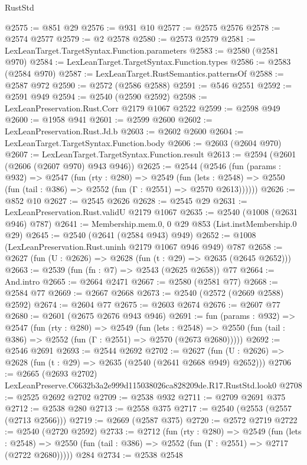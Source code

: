 \begin{lexlean}{RustStd}
\begin{coremodule}
@2575 := @851 @29
@2576 := @931 @10
@2577 := @2575 @2576
@2578 := @2574 @2577
@2579 := @2 @2578
@2580 := @2573 @2579
@2581 := LexLeanTarget.TargetSyntax.Function.parameters
@2583 := @2580 (@2581 @970)
@2584 := LexLeanTarget.TargetSyntax.Function.types
@2586 := @2583 (@2584 @970)
@2587 := LexLeanTarget.RustSemantics.patternsOf
@2588 := @2587 @972
@2590 := @2572 (@2586 @2588)
@2591 := @546 @2551
@2592 := @2591 @949
@2594 := @2540 (@2590 @2592)
@2598 := LexLeanPreservation.Rust.Corr @2179 @1067 @2522
@2599 := @2598 @949
@2600 := @1958 @941
@2601 := @2599 @2600
@2602 := LexLeanPreservation.Rust.Jd.b
@2603 := @2602 @2600
@2604 := LexLeanTarget.TargetSyntax.Function.body
@2606 := @2603 (@2604 @970)
@2607 := LexLeanTarget.TargetSyntax.Function.result
@2613 := @2594 (@2601 (@2606 (@2607 @970) @943 @946))
@2625 := @2544
    (@2546
      (fun (params : @932) =>
      @2547
        (fun (rty : @280) =>
        @2549
          (fun (lets : @2548) =>
          @2550 (fun (tail : @386) => @2552 (fun (Γ : @2551) => @2570 @2613))))))
@2626 := @852 @10
@2627 := @2545 @2626
@2628 := @2545 @29
@2631 := LexLeanPreservation.Rust.validU @2179 @1067
@2635 := @2540 (@1008 (@2631 @946) @787)
@2641 := Membership.mem.{0, 0} @29 @853 (List.instMembership.{0} @29)
@2645 := @2540 (@2641 (@2584 @943) @949)
@2652 := @1008 (LexLeanPreservation.Rust.uninh @2179 @1067 @946 @949) @787
@2658 := @2627 (fun (U : @2626) => @2628 (fun (t : @29) => @2635 (@2645 @2652)))
@2663 := @2539 (fun (fn : @7) => @2543 (@2625 @2658)) @77
@2664 := And.intro
@2665 := @2664 @2471
@2667 := @2580 (@2581 @77)
@2668 := @2584 @77
@2669 := @2667 @2668
@2673 := @2540 (@2572 (@2669 @2588) @2592)
@2674 := @2604 @77
@2675 := @2603 @2674
@2676 := @2607 @77
@2680 := @2601 (@2675 @2676 @943 @946)
@2691 := fun (params : @932) =>
  @2547
    (fun (rty : @280) =>
    @2549
      (fun (lets : @2548) =>
      @2550 (fun (tail : @386) => @2552 (fun (Γ : @2551) => @2570 (@2673 @2680)))))
@2692 := @2546 @2691
@2693 := @2544 @2692
@2702 := @2627 (fun (U : @2626) => @2628 (fun (t : @29) => @2635 (@2540 (@2641 @2668 @949) @2652)))
@2706 := @2665 (@2693 @2702) LexLeanPreserve.C6632b3a2e999d115038026ca828209de.R17.RustStd.look0
@2708 := @2525 @2692 @2702
@2709 := @2538 @932
@2711 := @2709 @2691 @375
@2712 := @2538 @280
@2713 := @2558 @375
@2717 := @2540 (@2553 (@2557 (@2713 @2566)))
@2719 := @2669 (@2587 @375)
@2720 := @2572 @2719
@2722 := @2540 (@2720 @2592)
@2733 := @2712
    (fun (rty : @280) =>
    @2549
      (fun (lets : @2548) =>
      @2550 (fun (tail : @386) => @2552 (fun (Γ : @2551) => @2717 (@2722 @2680)))))
    @284
@2734 := @2538 @2548

\end{coremodule}
\end{lexlean}
